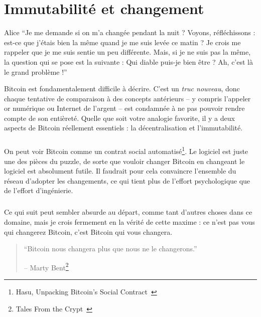 \chapter{Immutabilité et changement}
\label{les:1}

\begin{chapquote}{Alice}
\enquote{Je me demande si on m’a changée pendant la nuit ? Voyons,
réfléchissons : est-ce que j’étais bien la même quand je me suis levée ce
matin ? Je crois me rappeler que je me suis sentie un peu différente. Mais, si
je ne suis pas la même, la question qui se pose est la suivante : Qui diable
puis-je bien être ? Ah, c’est là le grand problème !}
\end{chapquote}

Bitcoin est fondamentalement difficile à décrire. C'est un \textit{truc
nouveau}, donc chaque tentative de comparaison à des concepts antérieurs -- y
compris l'appeler or numérique ou Internet de l'argent -- est condamnée à ne pas
pouvoir rendre compte de son entièreté. Quelle que soit votre analogie favorite,
il y a deux aspects de Bitcoin réellement essentiels : la décentralisation et
l'immutabilité.

\paragraph{}
On peut voir Bitcoin comme un contrat social automatisé\footnote{Hasu, Unpacking
Bitcoin's Social Contract~\cite{social-contract}}. Le logiciel est juste une des
pièces du puzzle, de sorte que vouloir changer Bitcoin en changeant le logiciel
est absolument futile. Il faudrait pour cela convaincre l'ensemble du réseau
d'adopter les changements, ce qui tient plus de l'effort psychologique que de
l'effort d'ingénierie.

\paragraph{}
Ce qui suit peut sembler absurde au départ, comme tant d'autres choses dans ce
domaine, mais je crois fermement en la vérité de cette maxime : ce n'est pas
vous qui changerez Bitcoin, c'est Bitcoin qui vous changera.

\begin{quotation}\begin{samepage}
\enquote{Bitcoin nous changera plus que nous ne le changerons.}
\begin{flushright} -- Marty Bent\footnote{Tales From the Crypt~\cite{tftc21}}
\end{flushright}\end{samepage}\end{quotation}


